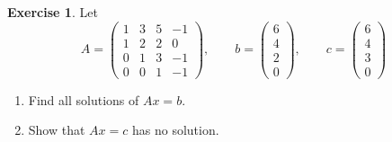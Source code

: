 \documentclass[12pt]{article}
\theoremstyle{definition}
\newtheorem{exercise}{Exercise}
\begin{document}
\begin{exercise}\label{r2-ex-system-drill}
Let
\[
A=\begin{pmatrix}1&3&5&-1\\1&2&2&0\\0&1&3&-1\\0&0&1&-1\end{pmatrix},\qquad
b=\begin{pmatrix}6\\4\\2\\0\end{pmatrix},\qquad c=\begin{pmatrix}6\\4\\3\\0\end{pmatrix}
\]
\begin{enumerate}
\item Find all solutions of \(Ax=b\).
\item Show that \(Ax=c\) has no solution.
\end{enumerate}
\end{exercise}
\end{document}
